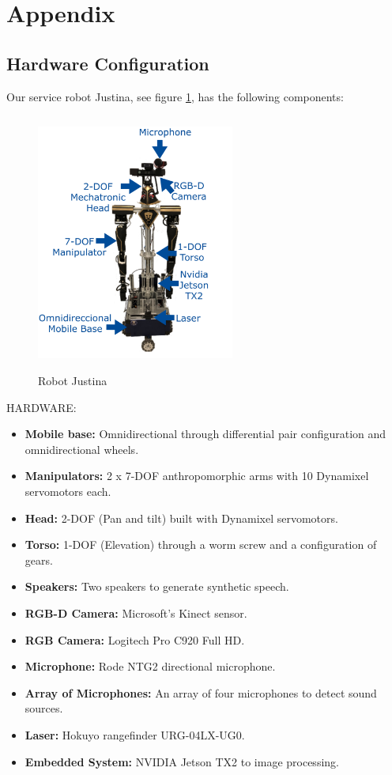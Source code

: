 \documentclass{llncs}
\begin{document}
\newpage	
\appendix
\section{Appendix}\label{sec:appendix}
\subsection{Hardware Configuration}

Our service robot Justina, see figure \ref{fig:justina}, has the following components:\\

\begin{figure}
	\includegraphics[angle=0, height=8.5cm, width=6.5cm]{Figures/justina_diagrama.png}
  \caption{Robot Justina}
  \label{fig:justina}
\end{figure}



HARDWARE:

\begin{itemize}
	\item \textbf{Mobile base:} Omnidirectional through differential pair configuration and omnidirectional wheels. 
	\item \textbf{Manipulators:} 2 x 7-DOF anthropomorphic arms with 10 Dynamixel servomotors each.
	\item \textbf{Head:} 2-DOF (Pan and tilt) built with Dynamixel servomotors.
	\item \textbf{Torso:} 1-DOF (Elevation) through a worm screw and a configuration of gears. 
	\item \textbf{Speakers:} Two speakers to generate synthetic speech.
	\item \textbf{RGB-D Camera:} Microsoft's Kinect sensor. 
	\item \textbf{RGB Camera:} Logitech Pro C920 Full HD.
	\item \textbf{Microphone:} Rode NTG2 directional microphone.
	\item \textbf{Array of Microphones:} An array of four microphones to detect sound sources.
	\item \textbf{Laser:} Hokuyo rangefinder URG-04LX-UG0.
	\item \textbf{Embedded System:} NVIDIA Jetson TX2 to image processing.
\end{itemize}
\end{document}
